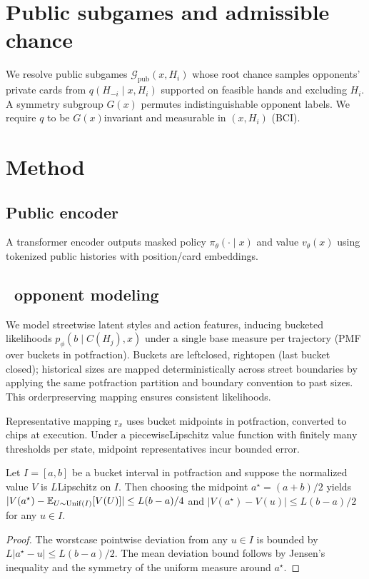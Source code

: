 \section{Public subgames and admissible chance}
We re\textendash solve public subgames $\mathcal{G}_{\text{pub}}(x,H_i)$ whose root chance samples opponents’ private cards from $q(H_{-i}\mid x,H_i)$ supported on feasible hands and excluding $H_i$. A symmetry subgroup $G(x)$ permutes indistinguishable opponent labels. We require $q$ to be $G(x)$\textendash invariant and measurable in $(x,H_i)$ (BCI).

\section{Method}
\subsection{Public encoder}
A transformer encoder outputs masked policy $\pi_\theta(\cdot\mid x)$ and value $v_\theta(x)$ using tokenized public histories with position/card embeddings.

\subsection{\sCRF\ opponent modeling}
We model streetwise latent styles and action features, inducing bucketed likelihoods $p_\phi(b\mid C(H_j),x)$ under a single base measure per trajectory (PMF over buckets in pot\textendash fraction). Buckets are left\textendash closed, right\textendash open (last bucket closed); historical sizes are mapped deterministically across street boundaries by applying the same pot\textendash fraction partition and boundary convention to past sizes. This order\textendash preserving mapping ensures consistent likelihoods.

Representative mapping r$_x$ uses bucket midpoints in pot\textendash fraction, converted to chips at execution. Under a piecewise\textendash Lipschitz value function with finitely many thresholds per state, midpoint representatives incur bounded error.

\begin{lemma}
Let $I=[a,b]$ be a bucket interval in pot\textendash fraction and suppose the normalized value $V$ is $L$\textendash Lipschitz on $I$. Then choosing the midpoint $a^\star=(a+b)/2$ yields $|V(a^\star)-\mathbb{E}_{U\sim\mathrm{Unif}(I)}[V(U)]|\le L(b-a)/4$ and $|V(a^\star)-V(u)|\le L(b-a)/2$ for any $u\in I$.
\end{lemma}
\begin{proof}
The worst\textendash case pointwise deviation from any $u\in I$ is bounded by $L|a^\star-u|\le L(b-a)/2$. The mean deviation bound follows by Jensen’s inequality and the symmetry of the uniform measure around $a^\star$.
\end{proof}

